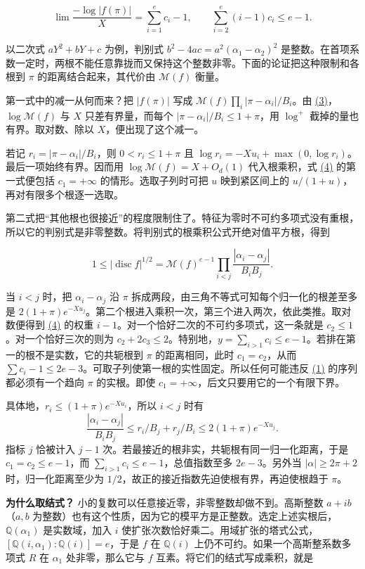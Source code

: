 \documentclass[11pt,a4paper]{article}
\begin{document}
\[
 \lim \frac{-\log|f(\pi)|}{X}=\sum_{i=1}^e c_i-1,\qquad
 \sum_{i=2}^e(i-1)c_i\le e-1.                                          \tag{4}\label{eq:4}
\]

以二次式 \(aY^2+bY+c\) 为例，判别式 \(b^2-4ac=a^2(\alpha_1-\alpha_2)^2\) 是整数。在首项系数一定时，两根不能任意靠拢而又保持这个整数非零。下面的论证把这种限制和各根到 \(\pi\) 的距离结合起来，其代价由 \(\mathcal M(f)\) 衡量。

第一式中的减一从何而来？把 \(|f(\pi)|\) 写成 \(\mathcal M(f)\prod_i|\pi-\alpha_i|/B_i\)。由 \hyperref[eq:3]{(3)}，\(\log\mathcal M(f)\) 与 \(X\) 只差有界量，而每个 \(|\pi-\alpha_i|/B_i\le 1+\pi\)，用 \(\log^+\) 截掉的量也有界。取对数、除以 \(X\)，便出现了这个减一。

若记 \(r_i=|\pi-\alpha_i|/B_i\)，则 \(0<r_i\le1+\pi\) 且 \(\log r_i=-Xu_i+\max(0,\log r_i)\)。最后一项始终有界。因而用 \(\log\mathcal M(f)=X+O_d(1)\) 代入根乘积，式 \hyperref[eq:4]{(4)} 的第一式便包括 \(c_1=+\infty\) 的情形。选取子列时可把 \(u\) 映到紧区间上的 \(u/(1+u)\)，再对有限多个根逐一选取。

第二式把``其他根也很接近''的程度限制住了。特征为零时不可约多项式没有重根，所以它的判别式是非零整数。将判别式的根乘积公式开绝对值平方根，得到

\[
 1\le |\operatorname{disc} f|^{1/2}
   =\mathcal M(f)^{e-1}\prod_{i<j}\frac{|\alpha_i-\alpha_j|}{B_iB_j}.
\]

当 \(i<j\) 时，把 \(\alpha_i-\alpha_j\) 沿 \(\pi\) 拆成两段，由三角不等式可知每个归一化的根差至多是 \(2(1+\pi)e^{-Xu_j}\)。第二个根进入乘积一次，第三个进入两次，依此类推。取对数便得到 \hyperref[eq:4]{(4)} 的权重 \(i-1\)。对一个恰好二次的不可约多项式，这一条就是 \(c_2\le1\)。对一个恰好三次的则为 \(c_2+2c_3\le2\)。特别地，\(y=\sum_{i>1}c_i\le e-1\)。若排在第一的根不是实数，它的共轭根到 \(\pi\) 的距离相同，此时 \(c_1=c_2\)，从而 \(\sum c_i-1\le 2e-3\)。可取子列使第一根的实性固定。所以任何可能违反 \hyperref[eq:1]{(1)} 的序列都必须有一个趋向 \(\pi\) 的实根。即使 \(c_1=+\infty\)，后文只要用它的一个有限下界。

具体地，\(r_i\le(1+\pi)e^{-Xu_i}\)，所以 \(i<j\) 时有 \[
 \frac{|\alpha_i-\alpha_j|}{B_iB_j}
 \le r_i/B_j+r_j/B_i\le 2(1+\pi)e^{-Xu_j}.
\] 指标 \(j\) 恰被计入 \(j-1\) 次。若最接近的根非实，共轭根有同一归一化距离，于是 \(c_1=c_2\le e-1\)，而 \(\sum_{i>1}c_i\le e-1\)，总值指数至多 \(2e-3\)。另外当 \(|\alpha|\ge 2\pi+2\) 时，归一化距离至少为 \(1/2\)，故正的接近指数先迫使根有界，再迫使根趋于 \(\pi\)。

\textbf{为什么取结式？} 小的复数可以任意接近零，非零整数却做不到。高斯整数 \(a+ib\)（\(a,b\) 为整数）也有这个性质，因为它的模平方是正整数。选定上述实根后，\(\mathbb Q(\alpha_1)\) 是实数域，加入 \(i\) 使扩张次数恰好乘二。用域扩张的塔式公式，\([\mathbb Q(i,\alpha_1):\mathbb Q(i)]=e\)，于是 \(f\) 在 \(\mathbb Q(i)\) 上仍不可约。如果一个高斯整系数多项式 \(R\) 在 \(\alpha_1\) 处非零，那么它与 \(f\) 互素。将它们的结式写成乘积，就是
\end{document}
